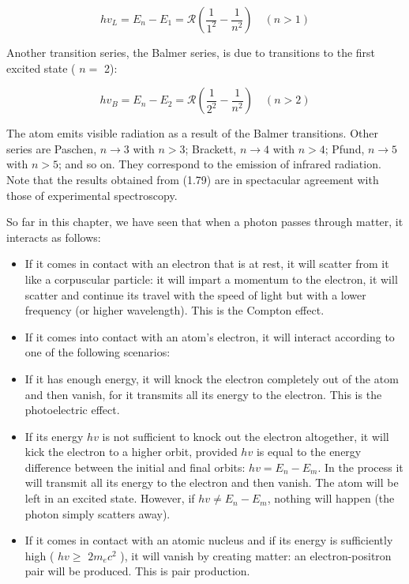 \documentclass[10pt]{article}
\begin{document}
\begin{equation*}
h v_{L}=E_{n}-E_{1}=\mathcal{R}\left(\frac{1}{1^{2}}-\frac{1}{n^{2}}\right) \quad(n>1) \tag{1.80}
\end{equation*}


Another transition series, the Balmer series, is due to transitions to the first excited state ( $n=$ 2):


\begin{equation*}
h v_{B}=E_{n}-E_{2}=\mathcal{R}\left(\frac{1}{2^{2}}-\frac{1}{n^{2}}\right) \quad(n>2) \tag{1.81}
\end{equation*}


The atom emits visible radiation as a result of the Balmer transitions. Other series are Paschen, $n \rightarrow 3$ with $n>3$; Brackett, $n \rightarrow 4$ with $n>4$; Pfund, $n \rightarrow 5$ with $n>5$; and so on. They correspond to the emission of infrared radiation. Note that the results obtained from (1.79) are in spectacular agreement with those of experimental spectroscopy.

So far in this chapter, we have seen that when a photon passes through matter, it interacts as follows:

\begin{itemize}
  \item If it comes in contact with an electron that is at rest, it will scatter from it like a corpuscular particle: it will impart a momentum to the electron, it will scatter and continue its travel with the speed of light but with a lower frequency (or higher wavelength). This is the Compton effect.
  \item If it comes into contact with an atom's electron, it will interact according to one of the following scenarios:
  \item If it has enough energy, it will knock the electron completely out of the atom and then vanish, for it transmits all its energy to the electron. This is the photoelectric effect.
  \item If its energy $h v$ is not sufficient to knock out the electron altogether, it will kick the electron to a higher orbit, provided $h v$ is equal to the energy difference between the initial and final orbits: $h v=E_{n}-E_{m}$. In the process it will transmit all its energy to the electron and then vanish. The atom will be left in an excited state. However, if $h v \neq E_{n}-E_{m}$, nothing will happen (the photon simply scatters away).
  \item If it comes in contact with an atomic nucleus and if its energy is sufficiently high ( $h v \geq$ $2 m_{e} c^{2}$ ), it will vanish by creating matter: an electron-positron pair will be produced. This is pair production.
\end{itemize}
\end{document}
